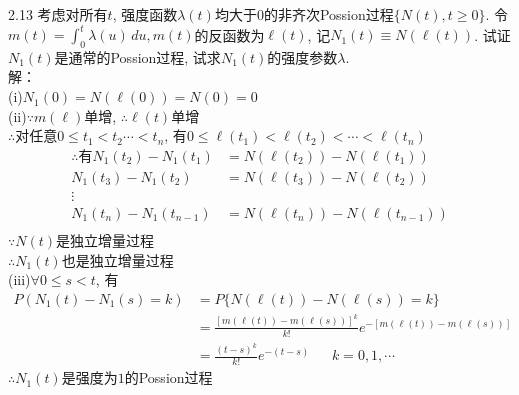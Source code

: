 2.13 考虑对所有$t$, 强度函数$\lambda (t)$均大于$0$的非齐次Possion过程$\{N(t), t \geqslant 0\}$. 令$m(t) = \int^t_0 \lambda(u)\, du, m(t)$的反函数为$\ell(t)$, 记$N_1(t)\equiv N(\ell(t))$. 试证$N_1(t)$是通常的Possion过程, 试求$N_1(t)$的强度参数$\lambda$.\\
解：\\
(i)$N_1(0)=N(\ell(0))=N(0)=0$\\
(ii)$\because m(\ell)$单增, $\therefore \ell(t)$单增\\
	$\therefore $对任意$0 \leqslant t_1 < t_2 \cdots < t_n$, 有$0 \leqslant \ell(t_1) < \ell(t_2) < \cdots < \ell(t_n)$\\
	\begin{align*}
	\therefore \text{有} N_1(t_2) - N_1(t_1) & = N(\ell(t_2)) - N(\ell(t_1))\\
				N_1(t_3) - N_1(t_2) & = N(\ell(t_3)) - N(\ell(t_2))\\
				\vdots \\
				N_1(t_n) - N_1(t_{n-1}) & = N(\ell(t_n)) - N(\ell(t_{n-1}))\\
	\end{align*}
	$\because N(t)$是独立增量过程\\
	$\therefore N_1(t)$也是独立增量过程\\
(iii)$\forall 0 \leqslant s < t$, 有\\
	\[
	\begin{split}
	P(N_1(t) - N_1(s) = k) & = P\{N(\ell(t)) - N(\ell(s)) = k\}\\
						& = \frac{[m(\ell(t)) - m(\ell(s))]^k}{k!} e^{-[m(\ell(t)) - m(\ell(s))]}\\
						& = \frac{(t-s)^k}{k!}e^{-(t-s)} ~~~~~~~k=0,1,\cdots
	\end{split}
	\]
	$\therefore N_1(t)$是强度为$1$的Possion过程


